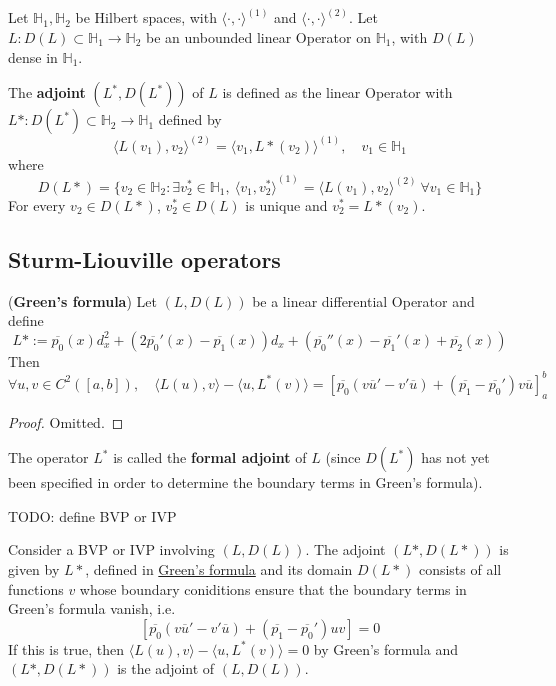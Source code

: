 \begin{definition}
	Let $\mathbb{H}_1, \mathbb{H}_2$ be Hilbert spaces, with ${\langle \cdot, \cdot \rangle}^{(1)}$ and ${\langle \cdot, \cdot \rangle}^{(2)}$. Let $L: D(L) \subset \mathbb{H}_1 \rightarrow \mathbb{H}_2$ be an unbounded linear Operator on $\mathbb{H}_1$, with $D(L)$ dense in $\mathbb{H}_1$.
	
	The \textbf{adjoint} $(L^*, D(L^*))$ of $L$ is defined as the linear Operator with $L*: D(L^*) \subset \mathbb{H}_2 \rightarrow \mathbb{H}_1$ defined by
	\[
		{\langle L(v_1), v_2 \rangle}^{(2)} = {\langle v_1, L*(v_2) \rangle}^{(1)}, \quad v_1 \in \mathbb{H}_1
	\]
	where
	\[
		D(L*) = \{ v_2 \in \mathbb{H}_2: \exists v_2^* \in \mathbb{H}_1, \  {\langle v_1, v_2^* \rangle}^{(1)} = {\langle L(v_1), v_2 \rangle}^{(2)} \ \forall v_1 \in \mathbb{H}_1 \}
	\]
	For every $v_2 \in D(L*)$, $v_2^* \in D(L)$ is unique and $v_2^* = L*(v_2)$.
\end{definition}

\subsection{Sturm-Liouville operators}

\begin{proposition}\label{prop:greensFormula}
	(\textbf{Green's formula}) Let $(L, D(L))$ be a linear differential Operator  and define
	\[
		L* := \overline{p_0} (x) d_x^2 + (2 \overline{p_0}'(x) - \overline{p_1}(x)) d_x + (\overline{p_0}''(x) - \overline{p_1}'(x) + \overline{p_2}(x))
	\]
	Then
	\[
		\forall u, v \in C^2 ([a, b]), \quad \langle L(u), v \rangle - \langle u, L^*(v) \rangle = {\left[ \overline{p_0} (v \overline{u}' - v' \overline{u}) + (\overline{p_1} - \overline{p_0}') v \overline{u} \right]}_a^b
	\]
\end{proposition}

\begin{proof}
	Omitted.
\end{proof}

\begin{definition}
	The operator $L^*$ is called the \textbf{formal adjoint} of $L$ (since $D(L^*)$ has not yet been specified in order to determine the boundary terms in Green's formula).
\end{definition}

TODO: define BVP or IVP

\begin{definition}
	Consider a BVP or IVP involving $(L, D(L))$. The adjoint $(L*, D(L*))$ is given by $L*$, defined in \hyperref[prop:greensFormula]{Green's formula} and its domain $D(L*)$ consists of all functions $v$ whose boundary coniditions ensure that the boundary terms in Green's formula vanish, i.e.
	\[
		\left[ \overline{p_0} (v \overline{u}' - v' \overline{u}) + (\overline{p_1} - \overline{p_0}') uv \right] = 0
	\]
	If this is true, then $\langle L(u), v \rangle - \langle u, L^*(v) \rangle = 0$ by Green's formula and $(L*, D(L*))$ is the adjoint of $(L, D(L))$.
\end{definition}

